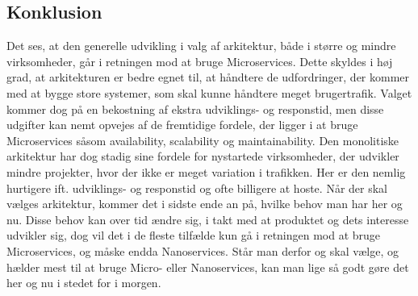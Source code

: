 \documentclass{article}
\begin{document}
\begin{flushleft}
\section*{Konklusion}
Det ses, at den generelle udvikling i valg af arkitektur, både i større og mindre virksomheder, går i retningen mod at bruge Microservices. Dette skyldes i høj grad, at arkitekturen er bedre egnet til, at håndtere de udfordringer, der kommer med at bygge store systemer, som skal kunne håndtere meget brugertrafik. Valget kommer dog på en bekostning af ekstra udviklings- og responstid, men disse udgifter kan nemt opvejes af de fremtidige fordele, der ligger i at bruge Microservices såsom availability, scalability og maintainability. Den monolitiske arkitektur har dog stadig sine fordele for nystartede virksomheder, der udvikler mindre projekter, hvor der ikke er meget variation i trafikken. Her er den nemlig hurtigere ift. udviklings- og responstid og ofte billigere at hoste. Når der skal vælges arkitektur, kommer det i sidste ende an på, hvilke behov man har her og nu. Disse behov kan over tid ændre sig, i takt med at produktet og dets interesse udvikler sig, dog vil det i de fleste tilfælde kun gå i retningen mod at bruge Microservices, og måske endda Nanoservices. Står man derfor og skal vælge, og hælder mest til at bruge Micro- eller Nanoservices, kan man lige så godt gøre det her og nu i stedet for i morgen.



\end{flushleft}
\end{document}
